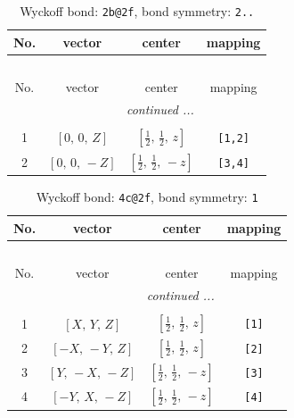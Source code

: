 \documentclass[fleqn,8pt]{jsarticle}
\begin{document}
\renewcommand{\arraystretch}{1.2}
\begin{longtable}{cccc}
\caption{Wyckoff bond: {\tt 2b@2f}, bond symmetry: {\tt 2..}}
 \\
 \hline \hline
No. & vector & center & mapping \\ \hline \endfirsthead

\multicolumn{3}{l}{\tablename\ \thetable{}} \\
 \hline \hline
No. & vector & center & mapping \\ \hline \endhead

 \hline \hline
\multicolumn{3}{r}{\footnotesize\it continued ...} \\ \endfoot

 \hline \hline
\multicolumn{3}{r}{} \\ \endlastfoot

1 & $\left[ 0,\, 0,\, Z \right]$ & $\left[ \frac{1}{2},\, \frac{1}{2},\, z \right]$ & {\tt [1,2]} \\ \hline
2 & $\left[ 0,\, 0,\, - Z \right]$ & $\left[ \frac{1}{2},\, \frac{1}{2},\, - z \right]$ & {\tt [3,4]} \\
\end{longtable}
\renewcommand{\arraystretch}{1.2}
\begin{longtable}{cccc}
\caption{Wyckoff bond: {\tt 4c@2f}, bond symmetry: {\tt 1}}
 \\
 \hline \hline
No. & vector & center & mapping \\ \hline \endfirsthead

\multicolumn{3}{l}{\tablename\ \thetable{}} \\
 \hline \hline
No. & vector & center & mapping \\ \hline \endhead

 \hline \hline
\multicolumn{3}{r}{\footnotesize\it continued ...} \\ \endfoot

 \hline \hline
\multicolumn{3}{r}{} \\ \endlastfoot

1 & $\left[ X,\, Y,\, Z \right]$ & $\left[ \frac{1}{2},\, \frac{1}{2},\, z \right]$ & {\tt [1]} \\ \hline
2 & $\left[ - X,\, - Y,\, Z \right]$ & $\left[ \frac{1}{2},\, \frac{1}{2},\, z \right]$ & {\tt [2]} \\ \hline
3 & $\left[ Y,\, - X,\, - Z \right]$ & $\left[ \frac{1}{2},\, \frac{1}{2},\, - z \right]$ & {\tt [3]} \\ \hline
4 & $\left[ - Y,\, X,\, - Z \right]$ & $\left[ \frac{1}{2},\, \frac{1}{2},\, - z \right]$ & {\tt [4]} \\
\end{longtable}
\end{document}
